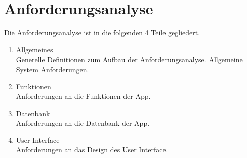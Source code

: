 \chapter{Anforderungsanalyse}

Die Anforderungsanalyse ist in die folgenden 4 Teile gegliedert.

\begin{enumerate}
	\item Allgemeines \\
	Generelle Definitionen zum Aufbau der Anforderungsanalyse. Allgemeine System Anforderungen.
	\item Funktionen \\
	Anforderungen an die Funktionen der App.
	\item Datenbank \\
	Anforderungen an die Datenbank der App.
	\item User Interface \\
	Anforderungen an das Design des User Interface.
\end{enumerate}







